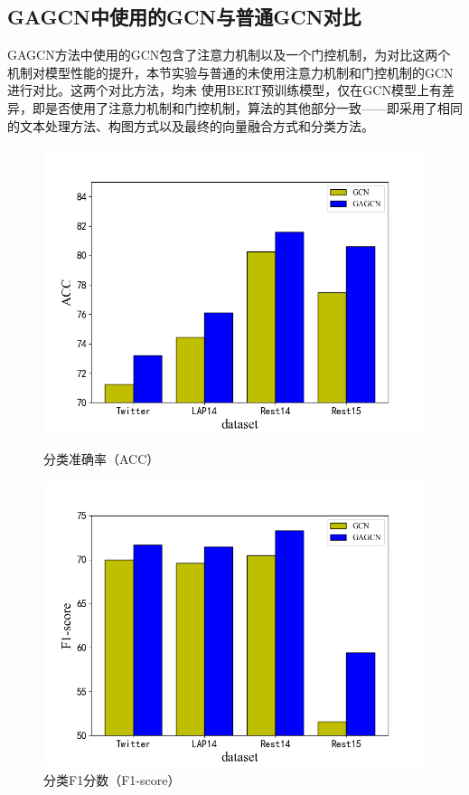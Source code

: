 \subsection{GAGCN中使用的GCN与普通GCN对比}
GAGCN方法中使用的GCN包含了注意力机制以及一个门控机制，为对比这两个机制对模型性能的提升，本节实验与普通的未使用注意力机制和门控机制的GCN进行对比。这两个对比方法，均未
使用BERT预训练模型，仅在GCN模型上有差异，即是否使用了注意力机制和门控机制，算法的其他部分一致——即采用了相同的文本处理方法、构图方式以及最终的向量融合方式和分类方法。
\begin{figure}[htb]
    \begin{minipage}[t]{0.5\linewidth}
    \centering
    \includegraphics[width=1\textwidth]{pic/gcn-gagcnAcc.png}
    \caption{分类准确率（ACC）}
    \label{gcn_gagcn_acc}
    \end{minipage}
    \quad
    \begin{minipage}[t]{0.5\linewidth}
    \centering
    \includegraphics[width=1\textwidth]{pic/gcn-gagcnF1.png}
    \caption{分类F1分数（F1-score）}
    \label{gcn_gagcn_f1}
    \end{minipage}
\end{figure}


